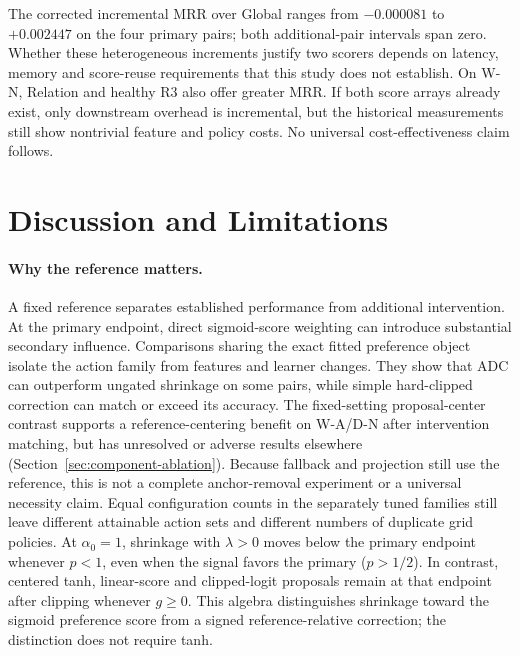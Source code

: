 \documentclass[11pt,a4paper]{article}
\begin{document}
The corrected incremental MRR over Global ranges from $-0.000081$ to $+0.002447$ on the four primary pairs; both additional-pair intervals span zero. Whether these heterogeneous increments justify two scorers depends on latency, memory and score-reuse requirements that this study does not establish. On W-N, Relation and healthy R3 also offer greater MRR. If both score arrays already exist, only downstream overhead is incremental, but the historical measurements still show nontrivial feature and policy costs. No universal cost-effectiveness claim follows.

\FloatBarrier
\section{Discussion and Limitations}
\label{sec:discussion}

\paragraph{Why the reference matters.}
A fixed reference separates established performance from additional intervention. At the primary endpoint, direct sigmoid-score weighting can introduce substantial secondary influence. Comparisons sharing the exact fitted preference object isolate the action family from features and learner changes. They show that ADC can outperform ungated shrinkage on some pairs, while simple hard-clipped correction can match or exceed its accuracy. The fixed-setting proposal-center contrast supports a reference-centering benefit on W-A/D-N after intervention matching, but has unresolved or adverse results elsewhere (Section~\ref{sec:component-ablation}). Because fallback and projection still use the reference, this is not a complete anchor-removal experiment or a universal necessity claim. Equal configuration counts in the separately tuned families still leave different attainable action sets and different numbers of duplicate grid policies.
At $\alpha_0=1$, shrinkage with $\lambda>0$ moves below the primary endpoint whenever $p<1$, even when the signal favors the primary ($p>1/2$). In contrast, centered tanh, linear-score and clipped-logit proposals remain at that endpoint after clipping whenever $g\geq0$. This algebra distinguishes shrinkage toward the sigmoid preference score from a signed reference-relative correction; the distinction does not require tanh.
\end{document}
